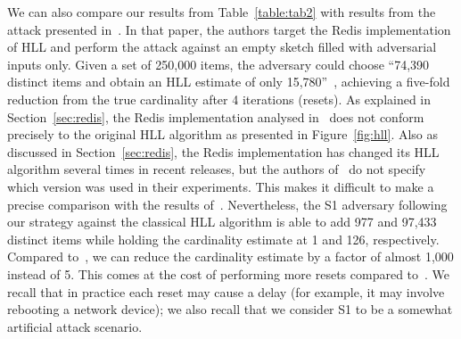 \documentclass[sigconf, anonymous, dvipsnames]{acmart} %
\begin{document}
We can also compare our results from Table~\ref{table:tab2} with results from the attack presented in~\cite[Section 5.1]{hllvuln}. In that paper, the authors target the Redis implementation of HLL and perform the attack against an empty sketch filled with adversarial inputs only. Given a set of 250,000 items, the adversary could choose ``74,390 distinct items and obtain an HLL estimate of only 15,780''~\cite{hllvuln}, achieving a five-fold reduction from the true cardinality after 4 iterations (resets). As explained in Section~\ref{sec:redis}, the Redis implementation analysed in~\cite{hllvuln} does not conform precisely to the original HLL algorithm as presented in Figure~\ref{fig:hll}. Also as discussed in Section~\ref{sec:redis}, the Redis implementation has changed its HLL algorithm several times in recent releases, but the authors of~\cite{hllvuln} do not specify which version was used in their experiments. This makes it difficult to make a precise comparison with the results of~\cite{hllvuln}. Nevertheless, the S1 adversary following our strategy against the classical HLL algorithm is able to add 977 and 97,433 distinct items while holding the cardinality estimate at 1 and 126, respectively. Compared to~\cite{hllvuln}, we can reduce the cardinality estimate by a factor of almost 1,000 instead of 5. This comes at the cost of performing more resets compared to~\cite{hllvuln}. We recall that in practice each reset may cause a delay (for example, it may involve rebooting a network device); we also recall that we consider S1 to be a somewhat artificial attack scenario.

\begin{table*}[tb!]
\small\centering
\caption{Attack results, averaged over 30 iterations.}
\medskip
\label{table:tab1}
\end{table*}
\end{document}
